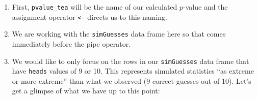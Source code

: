 \documentclass[]{tufte-book}
\newenvironment{Shaded}{\begin{snugshade}}{\end{snugshade}}
\newcommand{\KeywordTok}[1]{\textcolor[rgb]{0.13,0.29,0.53}{\textbf{{#1}}}}
\newcommand{\DecValTok}[1]{\textcolor[rgb]{0.00,0.00,0.81}{{#1}}}
\newcommand{\StringTok}[1]{\textcolor[rgb]{0.31,0.60,0.02}{{#1}}}
\newcommand{\NormalTok}[1]{{#1}}
\begin{document}
\begin{enumerate}
\def\labelenumi{\arabic{enumi}.}
\item
  First, \texttt{pvalue\_tea} will be the name of our calculated
  \(p\)-value and the assignment operator \texttt{\textless{}-} directs
  us to this naming.
\item
  We are working with the \texttt{simGuesses} data frame here so that
  comes immediately before the pipe operator.
\item
  We would like to only focus on the rows in our \texttt{simGuesses}
  data frame that have \texttt{heads} values of 9 or 10. This represents
  simulated statistics ``as extreme or more extreme'' than what we
  observed (9 correct guesses out of 10). Let's get a glimpse of what we
  have up to this point:

\begin{Shaded}
\end{Shaded}


\end{enumerate}
\end{document}
